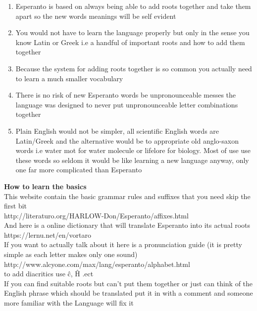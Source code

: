 \documentclass{article}
\begin{document}
\begin{itemize}
{\begin{enumerate}
\item{Esperanto is based on always being able to add roots together and take them apart so the new words meanings will be self evident }
\item{You would not have to learn the language properly but only in the sense you know Latin or Greek i.e a handful of important roots and how to add them together}
\item{Because the system for adding roots together is so common you actually need to learn a much smaller vocabulary}
\item{There is no risk of new Esperanto words be unpronounceable messes the language was designed to never put unpronounceable letter combinations together }
\item{Plain English would not be simpler, all scientific English words are Latin/Greek and the alternative would be to appropriate old anglo-saxon words i.e water mot for water molecule or lifelore for biology. Most of use use these words so seldom it would be like learning a new language anyway, only one far more complicated than Esperanto }
\end{enumerate}
\textbf{How to learn the basics} \\ This website contain the basic grammar rules and suffixes that you need skip the first bit \\ http://literaturo.org/HARLOW-Don/Esperanto/affixes.html\\ And here is a online dictionary that will translate Esperanto into its actual roots \\ https://lernu.net/en/vortaro  \\ 
If you want to actually talk about it here is a pronunciation guide (it is pretty simple as each letter makes only one sound)\\ http://www.alcyone.com/max/lang/esperanto/alphabet.html\\ to add diacritics use \^c, \^H .ect \\ If you can find suitable roots but can't put them together or just can think of the English phrase which should be translated put it in with a comment and someone more familiar with the Language will fix it}
\end{itemize}
\end{document}
